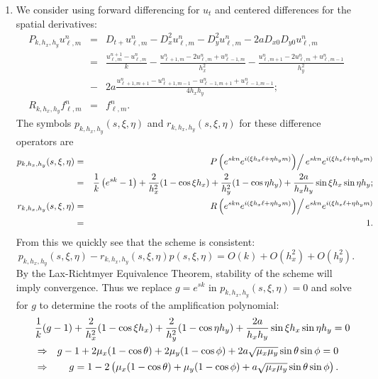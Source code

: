 \documentclass{article}
\begin{document}
\begin{enumerate}
\begin{enumerate}
\item We consider using forward differencing for \(u_t\) and centered differences for the spatial derivatives:
\begin{eqnarray*}
P_{k,h_x,h_y} u^n_{\ell,m}
& = & D_{t+} u^n_{\ell,m}
    - D_x^2 u^n_{\ell,m}
    - D_y^2 u^n_{\ell,m}
    - 2aD_{x0}D_{y0} u^n_{\ell,m} \\
& = & \frac{u^{n+1}_{\ell,m} - u^n_{\ell,m}}{k}
    - \frac{u^n_{\ell+1,m} - 2u^n_{\ell,m} + u^n_{\ell-1,m}}{h_x^2}
    - \frac{u^n_{\ell,m+1} - 2u^n_{\ell,m} + u^n_{\ell,m-1}}{h_y^2} \\
& - & 2a \frac{u^n_{\ell+1,m+1} - u^n_{\ell+1,m-1} - u^n_{\ell-1,m+1} + u^n_{\ell-1,m-1}}{4h_xh_y}; \\
R_{k,h_x,h_y} f^n_{\ell,m}
& = & f^n_{\ell,m}.
\end{eqnarray*}
The symbols \(p_{k,h_x,h_y}(s,\xi,\eta)\) and \(r_{k,h_x,h_y}(s,\xi,\eta)\) for these difference operators are
\begin{eqnarray*}
p_{k,h_x,h_y}(s,\xi,\eta)
& = & \left. P \left( e^{skn} e^{i(\xi h_x\ell + \eta h_y m)} \right) \right/ e^{skn} e^{i(\xi h_x\ell + \eta h_y m)} \\
& = & \frac{1}{k} \left( e^{sk} - 1 \right)
    + \frac{2}{h_x^2} (1 - \cos \xi h_x)
    + \frac{2}{h_y^2} (1 - \cos \eta h_y)
    + \frac{2a}{h_xh_y} \sin \xi h_x \sin \eta h_y; \\
r_{k,h_x,h_y}(s,\xi,\eta)
& = & \left. R \left( e^{skn} e^{i(\xi h_x\ell + \eta h_y m)} \right) \right/ e^{skn} e^{i(\xi h_x\ell + \eta h_y m)} \\
& = & 1.
\end{eqnarray*}
From this we quickly see that the scheme is consistent:
\[p_{k,h_x,h_y}(s,\xi,\eta) - r_{k,h_x,h_y}(s,\xi,\eta) p(s,\xi,\eta)
  = O(k) + O(h_x^2) + O(h_y^2).\]
By the Lax-Richtmyer Equivalence Theorem, stability of the scheme will imply convergence.  Thus we replace \(g = e^{sk}\) in \(p_{k,h_x,h_y}(s,\xi,\eta) = 0\) and solve for \(g\) to determine the roots of the amplification polynomial:
\begin{eqnarray*}
\lefteqn{\frac{1}{k} (g - 1) + \frac{2}{h_x^2} (1 - \cos \xi h_x) + \frac{2}{h_y^2} (1 - \cos \eta h_y) + \frac{2a}{h_xh_y} \sin \xi h_x \sin \eta h_y = 0} \\
& \Rightarrow & g - 1 + 2\mu_x (1 - \cos \theta) + 2\mu_y (1 - \cos \phi) + 2a\sqrt{\mu_x\mu_y} \sin \theta \sin \phi = 0 \\
& \Rightarrow & g = 1 - 2 \left( \mu_x (1 - \cos \theta) + \mu_y (1 - \cos \phi) + a \sqrt{\mu_x\mu_y} \sin \theta \sin \phi \right).

\end{eqnarray*}
\end{enumerate}
\end{enumerate}
\end{document}
